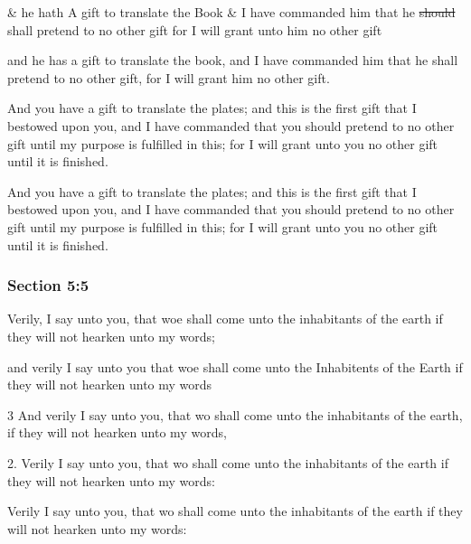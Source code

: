 		\begin{framed}
		\scriptsize
			\begin{compactdesc}
				\item[JSP] \& he hath A gift to translate the Book \& I have commanded him that he \sout{should} shall pretend to no other gift for I will grant unto him no other gift
				\item[RB1] [\textit{missing}]
				\item[BC] and he has a gift to translate the book, and I have commanded him that he shall pretend to no other gift, for I will grant him no other gift.
				\item[DC 1835] And you have a gift to translate the plates; and this is the first gift that I bestowed upon you, and I have commanded that you should pretend to no other gift until my purpose is fulfilled in this; for I will grant unto you no other gift until it is finished.
				\item[DC 1844] And you have a gift to translate the plates; and this is the first gift that I bestowed upon you, and I have commanded that you should pretend to no other gift until my purpose is fulfilled in this; for I will grant unto you no other gift until it is finished.
			\end{compactdesc}
		\end{framed}

	\subsubsection{Section 5:5} %
		\label{DC5-5}

		Verily, I say unto you, that woe shall come unto the inhabitants of the earth if they will not hearken unto my words;

		\begin{framed}
		\scriptsize
			\begin{compactdesc}
				\item[JSP] and verily I say unto you that woe shall come unto the Inhabitents of the Earth if they will not hearken unto my words
				\item[RB1] [\textit{missing}]
				\item[BC] 3 And verily I say unto you, that wo shall come unto the inhabitants of the earth, if they will not hearken unto my words,
				\item[DC 1835] 2. Verily I say unto you, that wo shall come unto the inhabitants of the earth if they will not hearken unto my words:
				\item[DC 1844] Verily I say unto you, that wo shall come unto the inhabitants of the earth if they will not hearken unto my words:
			\end{compactdesc}
		\end{framed}


